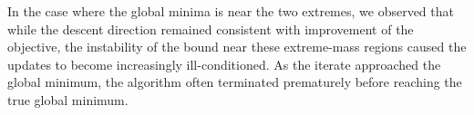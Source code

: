 \documentclass[EJP]{ejpecp} %
\begin{document}
In the case where the global minima is near the two extremes, we observed that while the descent direction remained consistent with improvement of the objective, the instability of the bound near these extreme-mass regions caused the updates to become increasingly ill-conditioned. As the iterate approached the global minimum, the algorithm often terminated prematurely before reaching the true global minimum.


\end{document}
